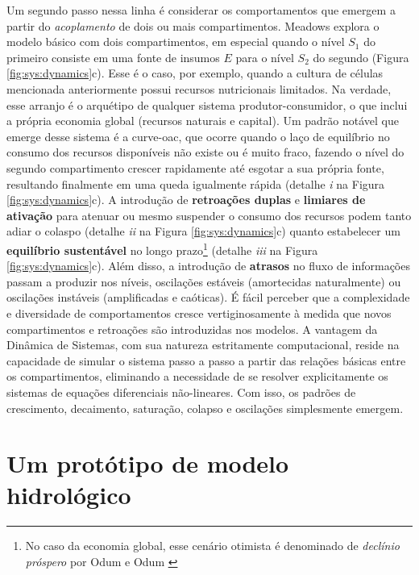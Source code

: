 \documentclass[./main.tex]{subfiles}
\begin{document}
\par Um segundo passo nessa linha é considerar os comportamentos que emergem a partir do \textit{acoplamento} de dois ou mais compartimentos. Meadows explora o modelo básico com dois compartimentos, em especial quando o nível $S_1$ do primeiro consiste em uma fonte de insumos $E$ para o nível $S_2$ do segundo (Figura \ref{fig:sys:dynamics}c). Esse é o caso, por exemplo, quando a cultura de células mencionada anteriormente possui recursos nutricionais limitados. Na verdade, esse arranjo é o arquétipo de qualquer sistema produtor-consumidor, o que inclui a própria economia global (recursos naturais e capital). Um padrão notável que emerge desse sistema é a \gls{curve-oac}, que ocorre quando o laço de equilíbrio no consumo dos recursos disponíveis não existe ou é muito fraco, fazendo o nível do segundo compartimento crescer rapidamente até esgotar a sua própria fonte, resultando finalmente em uma queda igualmente rápida (detalhe \textrm{\textit{i}} na Figura \ref{fig:sys:dynamics}c). A introdução de \textbf{retroações duplas} e \textbf{limiares de ativação} para atenuar ou mesmo suspender o consumo dos recursos podem tanto adiar o colaspo (detalhe \textrm{\textit{ii}} na Figura \ref{fig:sys:dynamics}c) quanto estabelecer um \textbf{equilíbrio sustentável} no longo prazo\footnote{No caso da economia global, esse cenário otimista é denominado de \textit{declínio próspero} por Odum e Odum \cite{odum2008}} (detalhe \textrm{\textit{iii}} na Figura \ref{fig:sys:dynamics}c). Além disso, a introdução de \textbf{atrasos} no fluxo de informações passam a produzir nos níveis, oscilações estáveis (amortecidas naturalmente) ou oscilações instáveis (amplificadas e caóticas). É fácil perceber que a complexidade e diversidade de comportamentos cresce vertiginosamente à medida que novos compartimentos e retroações são introduzidas nos modelos. A vantagem da Dinâmica de Sistemas, com sua natureza estritamente computacional, reside na capacidade de simular o sistema passo a passo a partir das relações básicas entre os compartimentos, eliminando a necessidade de se resolver explicitamente os sistemas de equações diferenciais não-lineares. Com isso, os padrões de crescimento, decaimento, saturação, colapso e oscilações simplesmente emergem.

\section{Um protótipo de modelo hidrológico} \label{sec:systems:model}
\end{document}
